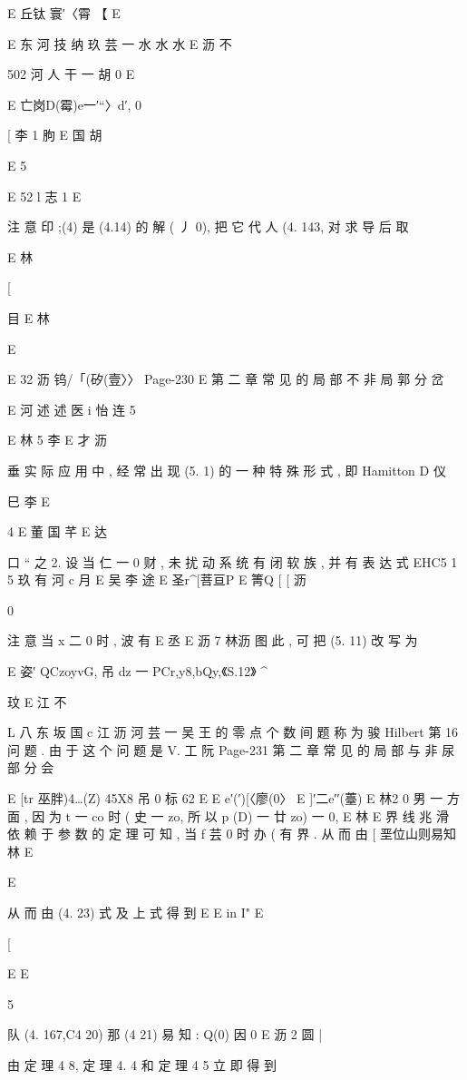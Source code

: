 {{{{{{{{{{{{{E 丘钛 寰′〈霄 【 E

E 东 河 技 纳 玖 芸 一 水 水 水
E 沥 不

502 河 人 干 一 胡 0
E

E 亡岗D(霉)e一′“〉d′, 0

[ 李 1 朐
E 国 胡

E
5

E
52
l 志 1
E

注 意 印 ;(4) 是 (4.14) 的 解 ( 丿 0), 把 它 代 人 (4. 143, 对 求 导 后 取

E
林

[

目
E 林

E

E 32 沥 钨/「(矽(壹〉〉
Page-230
E 第 二 章 常 见 的 局 部 不 非 局 郭 分 岔

E 河 述 述
医
i 怡 连 5

E 林 5 李 E 才 沥

垂 实 际 应 用 中 , 经 常 出 现 (5. 1) 的 一 种 特 殊 形 式 , 即 Hamitton
D 仪

巳 李
E

4 E
董 国 芊 E 达

口
“ 之 2. 设 当 仁 一 0 财 , 未 扰 动 系 统 有 闭 软 族 , 并 有 表 达 式
EHC5 1 5 玖 有 河 c 月
E 吴 李 途
E 圣r^[菩亘P E 箐Q [ [ 沥

0

注 意 当 x 二 0 时 , 波 有
E 丞
E 沥 7 林沥
图 此 , 可 把 (5. 11) 改 写 为

E 姿′ QCzoyvG, 吊 dz 一 PCr,y8,bQy,《S.12》
^

玟
E 江 不

L 八 东 坂 国 c 江 沥 河 芸 一 吴
王
的 零 点 个 数 间 题 称 为 骏 Hilbert 第 16 问 题 . 由 于 这 个 问 题 是 V. 工
阮
Page-231
第 二 章 常 见 的 局 部 与 非 尿 部 分 会

E [tr 巫胖)4…(Z) 45X8 吊 0 标 62
E
E e′(′)[〈廖(0〉 E ]′二e′′(薹) E 林2
0
男 一 方 面 , 因 为 t 一 co 时 ( 史 一 zo, 所 以 p (D) 一 廿 zo) 一 0,
E 林
E
界 线 兆 滑 依 赖 于 参 数 的 定 理 可 知 , 当 f 芸 0 时 办 ( 有 界 . 从 而 由
[ 垩位山则易知
林
E

E

从 而 由 (4. 23) 式 及 上 式 得 到
E
E in I" E

[

E E

5

队 (4. 167,C4 20) 那 (4 21) 易 知 : Q(0) 因 0
E 沥 2 圆 |

由 定 理 4 8, 定 理 4. 4 和 定 理 4 5 立 即 得 到

}}}}}}}}}}}}}
